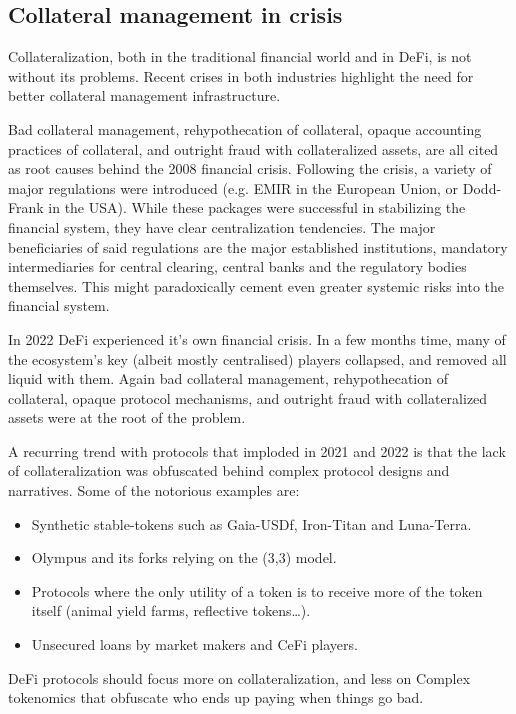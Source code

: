 \documentclass[sigconf,nonacm]{acmart}
\begin{document}
\subsection{Collateral management in crisis}
Collateralization, both in the traditional financial world and in DeFi, is not without its problems.
Recent crises in both industries highlight the need for better collateral management infrastructure.

Bad collateral management, rehypothecation of collateral, opaque accounting practices of collateral,
and outright fraud with collateralized assets, are all cited as root causes\cite{hellwig2008causes} behind the 2008 financial crisis.
Following the crisis, a variety of major regulations were introduced (e.g. EMIR in the European Union, or Dodd-Frank in the USA).
While these packages were successful in stabilizing the financial system, they have clear centralization tendencies\cite{gregory2014central}.
The major beneficiaries of said regulations are the major established institutions, mandatory intermediaries for central clearing, central banks and the regulatory bodies themselves.
This might paradoxically cement even greater systemic risks into the financial system.

In 2022 DeFi experienced it's own financial crisis.
In a few months time, many of the ecosystem's key (albeit mostly centralised) players collapsed, and removed all liquid with them.
Again bad collateral management, rehypothecation of collateral, opaque protocol mechanisms, and outright fraud with collateralized assets were at the root of the problem.

A recurring trend with protocols that imploded in 2021 and 2022 is that the lack of collateralization was obfuscated behind complex protocol designs and narratives. 
Some of the notorious examples are:
\begin{itemize}
    \item Synthetic stable-tokens such as Gaia-USDf, Iron-Titan and Luna-Terra.
    \item Olympus and its forks relying on the (3,3) model.
    \item Protocols where the only utility of a token is to receive more of the token itself (animal yield farms, reflective tokens…).
    \item Unsecured loans by market makers and CeFi players.
\end{itemize}

DeFi protocols should focus more on collateralization, and less on Complex tokenomics that obfuscate who ends up paying when things go bad.
\end{document}
